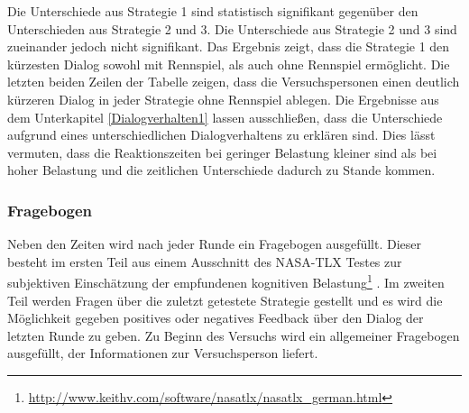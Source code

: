 \documentclass[12pt,a4paper]{scrartcl}
\begin{document}
Die Unterschiede aus Strategie 1 sind statistisch signifikant gegenüber den Unterschieden aus Strategie 2 und 3. Die Unterschiede aus Strategie 2 und 3 sind zueinander jedoch nicht signifikant. Das Ergebnis zeigt, dass die Strategie 1 den kürzesten Dialog sowohl mit Rennspiel, als auch ohne Rennspiel ermöglicht. Die letzten beiden Zeilen der Tabelle zeigen, dass die Versuchspersonen einen deutlich kürzeren Dialog in jeder Strategie ohne Rennspiel ablegen. Die Ergebnisse aus dem Unterkapitel \ref{Dialogverhalten1} lassen ausschließen, dass die Unterschiede aufgrund eines unterschiedlichen Dialogverhaltens zu erklären sind. Dies lässt vermuten, dass die Reaktionszeiten bei geringer Belastung kleiner sind als bei hoher Belastung und die zeitlichen Unterschiede dadurch zu Stande kommen. 
\subsubsection{Fragebogen}
\label{fragebogen}
Neben den Zeiten wird nach jeder Runde ein Fragebogen ausgefüllt. Dieser besteht im ersten Teil aus einem Ausschnitt des NASA-TLX Testes zur subjektiven Einschätzung der empfundenen kognitiven Belastung\footnote{\label{foot:nasatlx1}\url{http://www.keithv.com/software/nasatlx/nasatlx_german.html}} . Im zweiten Teil werden Fragen über die zuletzt getestete Strategie gestellt und es wird die Möglichkeit gegeben positives oder negatives Feedback über den Dialog der letzten Runde zu geben. Zu Beginn des Versuchs wird ein allgemeiner Fragebogen ausgefüllt, der Informationen zur Versuchsperson liefert. 
\end{document}
